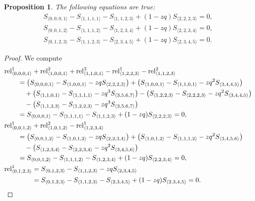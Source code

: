 \documentclass[pdftex]{sigma}
\numberwithin{equation}{section}
\newtheorem{Proposition}[Theorem]{Proposition}
\theoremstyle{definition}
\newcommand{\rel}{\text{rel}}
\begin{document}
\begin{Proposition}
The following equations are true:
\begin{gather*}
 S_{\langle 0, 0, 0, 1\rangle}- S_{\langle 1, 1, 1, 1\rangle} - S_{\langle 1, 1, 2, 3\rangle} + (1-zq)S_{\langle 2, 2, 2, 3\rangle} =0, \\
 S_{\langle 0, 0, 1,2\rangle}- S_{\langle 1, 1, 1, 2\rangle} - S_{\langle 1, 2,3,4\rangle} + (1-zq)S_{\langle 2, 2, 3, 4\rangle} =0, \\
 S_{\langle 0, 1,2,3\rangle}- S_{\langle 1,1,2,3\rangle} - S_{\langle 2,3,4,5\rangle} + (1-zq)S_{\langle 2, 3,4,5\rangle} =0.
\end{gather*}
\end{Proposition}

\begin{proof}
We compute
\begin{align*}
&\rel^1_{\langle0,0,0,1\rangle}+\rel^2_{\langle 1,0,0,1\rangle}+\rel^3_{\langle 1,1,0,1\rangle}
-\rel^1_{\langle 1,2,2,3\rangle }-\rel^2_{\langle 1,1,2,3\rangle} \\
& \qquad {}=\bigl(S_{\langle 0, 0, 0, 1\rangle} - S_{\langle 1, 0, 0, 1\rangle} -zq S_{\langle 2, 2, 2, 3\rangle}\bigr) + \bigl(S_{\langle 1, 0, 0, 1\rangle} - S_{\langle 1, 1, 0, 1\rangle} -zq^2 S_{\langle 3, 4, 4, 5\rangle}\bigr) \\
& \qquad\quad{} +\bigl( S_{\langle 1, 1, 0, 1\rangle} - S_{\langle 1, 1, 1, 1\rangle} -zq^3 S_{\langle 3, 5, 6, 7\rangle}\bigr) -\bigl(S_{\langle 1, 2, 2, 3\rangle} - S_{\langle 2, 2, 2, 3\rangle}-zq^2 S_{\langle 3, 4, 4, 5\rangle}\bigr) \\
& \qquad \quad{} -\bigl(S_{\langle 1, 1, 2, 3\rangle} - S_{\langle 1, 2, 2, 3\rangle}-zq^3 S_{\langle 3, 5, 6, 7\rangle}\bigr) \\
&\qquad =S_{\langle 0, 0, 0, 1\rangle}- S_{\langle 1, 1, 1, 1\rangle} - S_{\langle 1, 1, 2, 3\rangle} + (1-zq)S_{\langle 2, 2, 2, 3\rangle} =0,
\\
&\rel^1_{\langle0,0,1,2\rangle}+\rel^2_{\langle 1,0,1,2\rangle}-\rel^1_{\langle 1,2,3,4\rangle}\\
&\qquad =\bigl(S_{\langle 0, 0, 1, 2\rangle} - S_{\langle 1, 0, 1, 2\rangle} -zq S_{\langle 2, 2, 3, 4\rangle}\bigr) + \bigl(S_{\langle 1, 0, 1, 2\rangle} - S_{\langle 1, 1, 1, 2\rangle} -zq^2 S_{\langle 3, 4, 5, 6\rangle}\bigr) \\
& \qquad\quad{} -\bigl(S_{\langle 1, 2, 3, 4\rangle} - S_{\langle 2, 2, 3, 4\rangle}-zq^2 S_{\langle 3, 4, 5, 6\rangle}\bigr) \\
& \qquad =S_{\langle 0, 0, 1, 2\rangle}- S_{\langle 1, 1, 1, 2\rangle} - S_{\langle 1, 2,3,4\rangle} + (1-zq)S_{\langle 2, 2, 3,4\rangle} =0,
\\
&\rel^1_{\langle0,1,2,3\rangle} =S_{\langle 0, 1, 2,3\rangle} - S_{\langle 1, 1,2,3\rangle} -zq S_{\langle 2, 3, 4, 5\rangle} \\
&\hphantom{\rel^1_{\langle0,1,2,3\rangle}} {}=S_{\langle 0, 1,2,3\rangle}- S_{\langle 1,1,2,3\rangle} - S_{\langle 2,3,4,5\rangle} + (1-zq)S_{\langle 2, 3,4,5\rangle} =0. \tag*{\qed}
\end{align*}
\renewcommand{\qed}{}
\end{proof}
\end{document}
